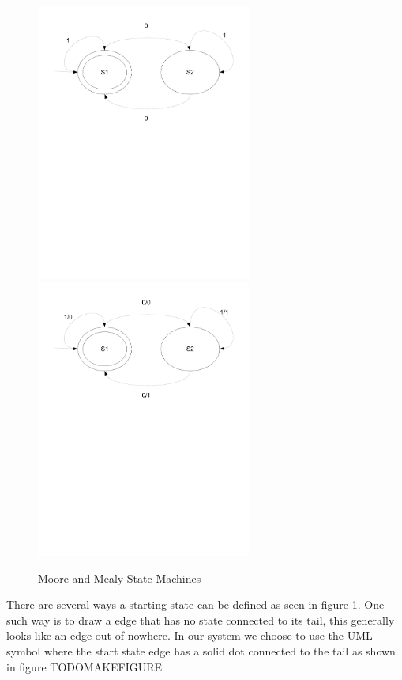 \begin{figure}[htp]
    \centering
    \includegraphics[trim= 15mm 150mm 15mm 10mm, clip ,width=200pt]{./images/state_moore.pdf} 
    \includegraphics[trim= 15mm 150mm 15mm 10mm, clip ,width=200pt]{./images/state_mealy.pdf}    
    \caption{Moore and Mealy State Machines}
    \label{fig:state_moore_mealy}
\end{figure}

There are several ways a starting state can be defined as seen in figure \ref{fig:state_moore_mealy}.
One such way is to draw a edge that has no state connected to its tail, this generally looks like an edge out of nowhere. In our system we choose to use the UML symbol where the start state edge has a solid dot connected to the tail as shown in figure TODOMAKEFIGURE %

